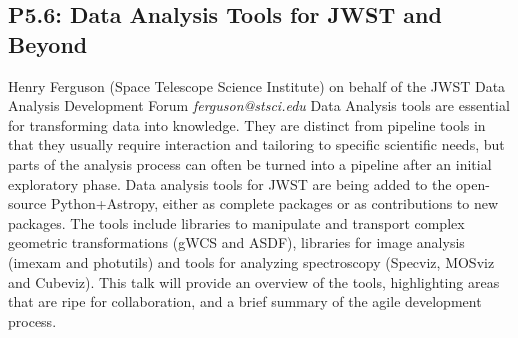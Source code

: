 \documentclass{report}
\begin{document}
\subsection*{P5.6: Data Analysis Tools for JWST and Beyond}
\bigskip
Henry Ferguson (Space Telescope Science Institute) \newline on behalf of the JWST Data Analysis Development Forum  \newline   \newline   \newline  \newline  \newline\newline
{\it ferguson@stsci.edu}\newline
\newline\newline
Data Analysis tools are essential for transforming data into knowledge. They are distinct from pipeline tools in that they usually require interaction and tailoring to specific scientific needs, but parts of the analysis process can often be turned into a pipeline after an initial exploratory phase. Data analysis tools for JWST are being added to the open-source Python+Astropy, either as complete packages or as contributions to new packages. The tools include libraries to manipulate and transport complex geometric transformations (gWCS and ASDF), libraries for image analysis (imexam and photutils) and tools for analyzing spectroscopy (Specviz, MOSviz and Cubeviz).  This talk will provide an overview of the tools, highlighting areas that are ripe for collaboration, and a brief summary of the agile development process.\newline
\newpage
\end{document}
